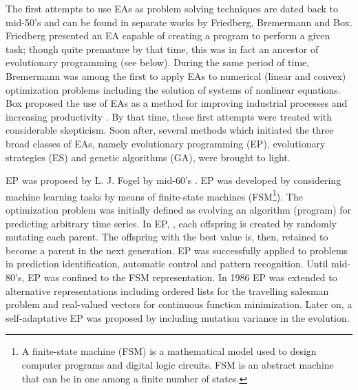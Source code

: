 The first attempts to use EAs as problem solving techniques are dated back to mid-50's and can be found in separate works by Friedberg, Bremermann and Box. Friedberg \cite{Friedberg:1958:LMP:1662346.1662347, Friedberg:1959:LMP:1661923.1661930} presented an EA capable of creating a program to perform a given task; though quite premature by that time, this was in fact an ancestor of evolutionary programming (see below). During the same period of time, Bremermann \cite{Bremermann_62} was among the first to apply EAs to numerical (linear and convex) optimization problems including the solution of systems of nonlinear equations. Box proposed the use of EAs as a method for improving industrial processes and increasing productivity \cite{Box57a,BoDr98a}. By that time, these first attempts were treated with considerable skepticism. Soon after, several methods which initiated the three broad classes of EAs, namely evolutionary programming (EP), evolutionary strategies (ES) and genetic algorithms (GA), were brought to light.

EP was proposed by L. J. Fogel by mid-60's  \cite{fogel62,fogel64,fogel66}. EP was developed by considering machine learning tasks by means of finite-state machines (FSM\footnote{A finite-state machine (FSM) is a mathematical model used to design computer programs and digital logic circuits. FSM is an abstract machine that can be in one among a finite number of states.}). The optimization problem was  initially defined as evolving an algorithm (program) for predicting arbitrary time series.  In EP,  \cite{Fogel}, each offspring is created by randomly mutating each parent. The offspring with the best value is, then, retained to become a parent in the next generation. EP was successfully applied to problems in prediction identification, automatic control and pattern recognition. Until mid-80's, EP was confined to the FSM representation. In 1986 EP was extended to alternative representations including ordered lists for the travelling salesman problem and real-valued vectors for continuous function minimization. Later on, a self-adaptative EP \cite{fogel95} was proposed by including mutation variance in the evolution.

